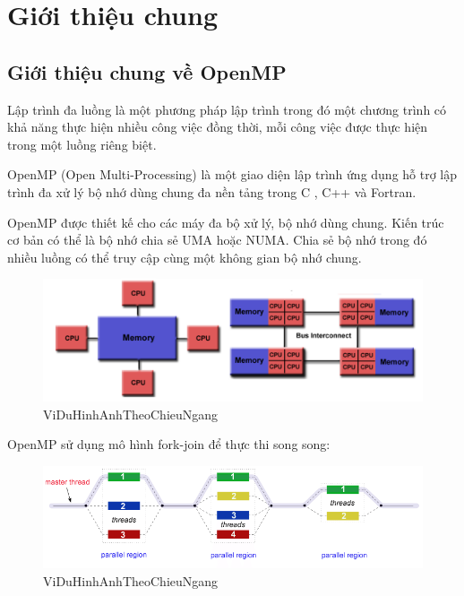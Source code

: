 \newpage
\section{Giới thiệu chung}
\subsection{Giới thiệu chung về OpenMP}
Lập trình đa luồng là một phương pháp lập trình trong đó một chương trình có khả năng thực hiện nhiều công việc đồng thời, mỗi công việc được thực hiện trong một luồng riêng biệt.

OpenMP (Open Multi-Processing) là một giao diện lập trình ứng dụng   hỗ trợ lập trình đa xử lý bộ nhớ dùng chung đa nền tảng trong C , C++ và Fortran.

OpenMP được thiết kế cho các máy đa bộ xử lý, bộ nhớ dùng chung. Kiến trúc cơ bản có thể là bộ nhớ chia sẻ UMA hoặc NUMA.           Chia sẻ bộ nhớ     trong đó nhiều luồng có thể truy cập cùng một không gian bộ nhớ chung.  

\begin{figure}[h]         
    \centering
    \includegraphics[width=1\textwidth]{pictures/000.png}         
    \caption{ViDuHinhAnhTheoChieuNgang}         
    \label{pictures:000}         
    \end{figure} 
    
    
    
OpenMP sử dụng mô hình fork-join để thực thi song song:
 
\begin{figure}[h]         
    \centering
    \includegraphics[width=1\textwidth]{pictures/Fork-Join-model-WebSite-4.png}         
    \caption{ViDuHinhAnhTheoChieuNgang}         
    \label{pictures:0001}         
    \end{figure} 



